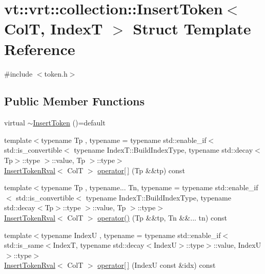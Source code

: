 \hypertarget{structvt_1_1vrt_1_1collection_1_1_insert_token}{}\section{vt\+:\+:vrt\+:\+:collection\+:\+:Insert\+Token$<$ ColT, IndexT $>$ Struct Template Reference}
\label{structvt_1_1vrt_1_1collection_1_1_insert_token}


{\ttfamily \#include $<$token.\+h$>$}

\subsection*{Public Member Functions}
\begin{DoxyCompactItemize}
\item 
virtual \hyperlink{structvt_1_1vrt_1_1collection_1_1_insert_token_a387506c3e013a275665e644d99b75577}{$\sim$\+Insert\+Token} ()=default
\item 
{\footnotesize template$<$typename Tp , typename  = typename std\+::enable\+\_\+if$<$      std\+::is\+\_\+convertible$<$        typename Index\+T\+::\+Build\+Index\+Type, typename std\+::decay$<$\+Tp$>$\+::type      $>$\+::value, Tp    $>$\+::type$>$ }\\\hyperlink{structvt_1_1vrt_1_1collection_1_1_insert_token_rval}{Insert\+Token\+Rval}$<$ ColT $>$ \hyperlink{structvt_1_1vrt_1_1collection_1_1_insert_token_acf463a3c311249bcfad332e6a87c757a}{operator\mbox{[}$\,$\mbox{]}} (Tp \&\&tp) const
\item 
{\footnotesize template$<$typename Tp , typename... Tn, typename  = typename std\+::enable\+\_\+if$<$      std\+::is\+\_\+convertible$<$        typename Index\+T\+::\+Build\+Index\+Type, typename std\+::decay$<$\+Tp$>$\+::type      $>$\+::value, Tp    $>$\+::type$>$ }\\\hyperlink{structvt_1_1vrt_1_1collection_1_1_insert_token_rval}{Insert\+Token\+Rval}$<$ ColT $>$ \hyperlink{structvt_1_1vrt_1_1collection_1_1_insert_token_ae7065dd97dded33cbd5f11b20c1d309a}{operator()} (Tp \&\&tp, Tn \&\&... tn) const
\item 
{\footnotesize template$<$typename IndexU , typename  = typename std\+::enable\+\_\+if$<$      std\+::is\+\_\+same$<$\+Index\+T, typename std\+::decay$<$\+Index\+U$>$\+::type$>$\+::value, Index\+U    $>$\+::type$>$ }\\\hyperlink{structvt_1_1vrt_1_1collection_1_1_insert_token_rval}{Insert\+Token\+Rval}$<$ ColT $>$ \hyperlink{structvt_1_1vrt_1_1collection_1_1_insert_token_ad0f93ec8c0d9cbf770c07c3129153b92}{operator\mbox{[}$\,$\mbox{]}} (IndexU const \&idx) const

\end{DoxyCompactItemize}
